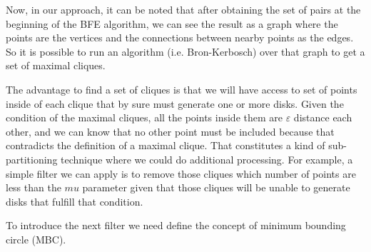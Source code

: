 \begin{itemize}
Now, in our approach, it can be noted that after obtaining the set of pairs at the beginning of the BFE algorithm, we can see the result as a graph where the points are the vertices and the connections between nearby points as the edges.  So it is possible to run an algorithm (i.e. Bron-Kerbosch) over that graph to get a set of maximal cliques.

The advantage to find a set of cliques is that we will have access to set of points inside of each clique that by sure must generate one or more disks.  Given the condition of the maximal cliques, all the points inside them are $\varepsilon$ distance each other, and we can know that no other point must be included because that contradicts the definition of a maximal clique.  That constitutes a kind of sub-partitioning technique where we could do additional processing. For example, a simple filter we can apply is to remove those cliques which number of points are less than the $mu$ parameter given that those cliques will be unable to generate disks that fulfill that condition.

To introduce the next filter we need define the concept of minimum bounding circle (MBC).




\end{itemize}
